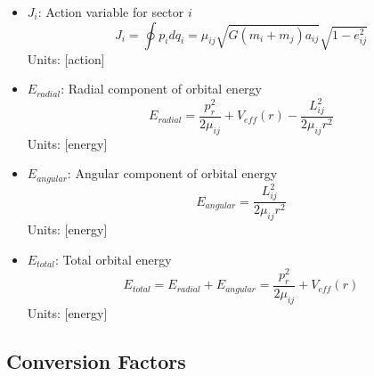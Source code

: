\documentclass{article}
\begin{document}
\begin{itemize}
\item $J_i$: Action variable for sector $i$
    \begin{equation}
    J_i = \oint p_i dq_i = \mu_{ij}\sqrt{G(m_i+m_j)a_{ij}}\sqrt{1-e_{ij}^2}
    \end{equation}
    Units: [action]
    
\item $E_{radial}$: Radial component of orbital energy
    \begin{equation}
    E_{radial} = \frac{p_r^2}{2\mu_{ij}} + V_{eff}(r) - \frac{L_{ij}^2}{2\mu_{ij}r^2}
    \end{equation}
    Units: [energy]
    
\item $E_{angular}$: Angular component of orbital energy
    \begin{equation}
    E_{angular} = \frac{L_{ij}^2}{2\mu_{ij}r^2}
    \end{equation}
    Units: [energy]
    
\item $E_{total}$: Total orbital energy
    \begin{equation}
    E_{total} = E_{radial} + E_{angular} = \frac{p_r^2}{2\mu_{ij}} + V_{eff}(r)
    \end{equation}
    Units: [energy]
\end{itemize}

\subsection{Conversion Factors}
\end{document}
